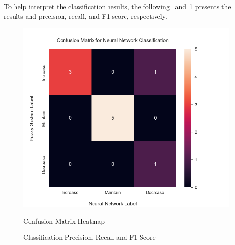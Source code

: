\documentclass[titlepage]{article}
\begin{document}
To help interpret the classification results, the following~ and~\cref{tab:scores_final} presents the results and precision, recall, and F1 score, respectively.

\begin{figure}[H]
    \centering
    \begin{minipage}{0.55\textwidth}
    \includegraphics[width=\textwidth]{../images/final_results/conf_matrix}
    \caption{Confusion Matrix Heatmap}
    \label{fig:conf_matrix_final}
    \end{minipage}
    \hfill
    \begin{minipage}{0.4\textwidth}
        \begin{table}[H]
            \centering
            
            \caption{Classification Precision, Recall and F1-Score}
            \label{tab:scores_final}
        \end{table}
    \end{minipage}
\end{figure}
\end{document}
